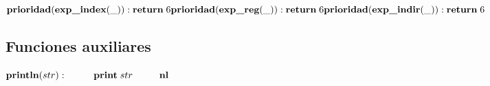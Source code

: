 \begin{math}
    \textbf{prioridad}(\textbf{exp\_index}(\_)): \textbf{return} \; 6 \\
    \textbf{prioridad}(\textbf{exp\_reg}(\_)): \textbf{return} \; 6 \\
    \textbf{prioridad}(\textbf{exp\_indir}(\_)): \textbf{return} \; 6
\end{math}

\subsection{Funciones auxiliares}

\begin{math}
    \textbf{println}(str): \\
        \phantom{---} \textbf{print} \; str \\
        \phantom{---} \textbf{nl}
\end{math}

